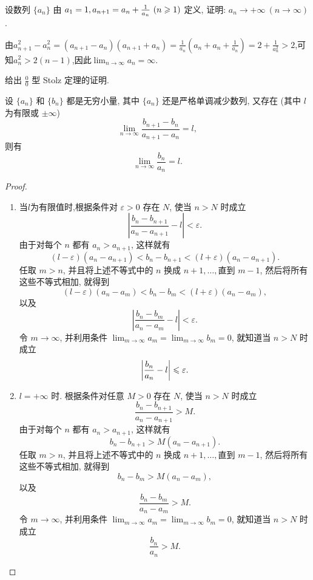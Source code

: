 \begin{exercise}[1.2.25]
    设数列 $\{a_n\}$ 由 $a_1 = 1, a_{n+1} = a_n + \frac{1}{a_n} \ (n \ges 1)$ 定义, 证明: $a_n \to +\infty \ (n \to \infty)$.
\end{exercise}

\begin{solution}
    由$a_{n+1}^2 - a_n^2 = (a_{n+1} - a_n)(a_{n+1} + a_n) = \frac{1}{a_n}(a_n + a_n + \frac{1}{a_n}) = 2 + \frac{1}{a_n^2} > 2$,可知$a_n^2 > 2(n-1)$,因此$\lim_{n\to\infty} a_n = \infty$.
\end{solution}

\begin{exercise}[1.2.26]
    给出 $\frac{0}{0}$ 型 Stolz 定理的证明.
\end{exercise}

\begin{proposition*}
    设 $\{a_n\}$ 和 $\{b_n\}$ 都是无穷小量, 其中 $\{a_n\}$ 还是严格单调减少数列, 又存在 (其中 $l$ 为有限或 $\pm\infty$)
    $$ \lim_{n \to \infty} \frac{b_{n+1}-b_n}{a_{n+1}-a_n} = l, $$
    则有
    $$ \lim_{n \to \infty} \frac{b_n}{a_n} = l. $$
\end{proposition*}

\begin{proof}
    \begin{enumerate}[(1)]
        \item 当$l$为有限值时,根据条件对 $\varepsilon > 0$ 存在 $N$, 使当 $n > N$ 时成立
              $$ \left|\frac{b_n-b_{n+1}}{a_n-a_{n+1}} - l \right| < \varepsilon. $$
              由于对每个 $n$ 都有 $a_n > a_{n+1}$, 这样就有
              $$ (l-\varepsilon)(a_n-a_{n+1}) < b_n - b_{n+1} < (l+\varepsilon)(a_n-a_{n+1}). $$
              任取 $m>n$, 并且将上述不等式中的 $n$ 换成 $n+1, \dots, \text{直到 } m-1$, 然后将所有这些不等式相加, 就得到
              $$ (l-\varepsilon)(a_n-a_m) < b_n - b_m < (l+\varepsilon)(a_n-a_m), $$
              以及
              $$ \left|\frac{b_n-b_m}{a_n-a_m} - l \right| < \varepsilon. $$
              令 $m \to \infty$, 并利用条件 $\lim_{m \to \infty} a_m = \lim_{m \to \infty} b_m = 0$, 就知道当 $n>N$ 时成立
              $$ \left|\frac{b_n}{a_n} - l \right| \leqslant \varepsilon. $$
        \item $l = +\infty$ 时. 根据条件对任意 $M > 0$ 存在 $N$, 使当 $n > N$ 时成立
              $$ \frac{b_n-b_{n+1}}{a_n-a_{n+1}} > M. $$
              由于对每个 $n$ 都有 $a_n > a_{n+1}$, 这样就有
              $$ b_n - b_{n+1} > M(a_n-a_{n+1}). $$
              任取 $m>n$, 并且将上述不等式中的 $n$ 换成 $n+1, \dots, \text{直到 } m-1$, 然后将所有这些不等式相加, 就得到
              $$ b_n - b_m > M(a_n-a_m), $$
              以及
              $$ \frac{b_n-b_m}{a_n-a_m} > M. $$
              令 $m \to \infty$, 并利用条件 $\lim_{m \to \infty} a_m = \lim_{m \to \infty} b_m = 0$, 就知道当 $n>N$ 时成立
              $$ \frac{b_n}{a_n} > M.  $$
    \end{enumerate}
\end{proof}


\newpage